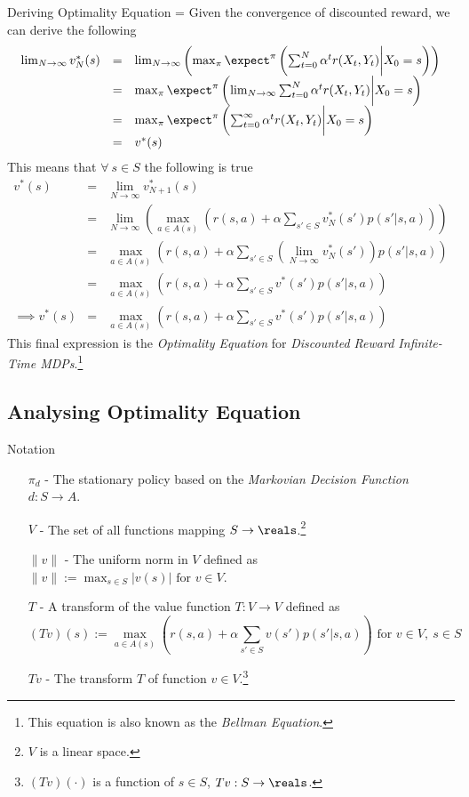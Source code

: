 \documentclass[11pt,a4paper]{article}
\begin{document}
  \begin{proposition}{Deriving Optimality Equation}
    \everymath={\displaystyle}
    Given the convergence of discounted reward, we can derive the following
    \[\begin{array}{rcl}
      \lim_{N\to\infty}v_N^*(s)&=&\lim_{N\to\infty}\left(\max_\pi\expect^\pi\left(\sum_{t=0}^N\alpha^tr(X_t,Y_t)\bigg|X_0=s\right)\right)\\
      &=&\max_\pi\expect^\pi\left(\lim_{N\to\infty}\sum_{t=0}^N\alpha^tr(X_t,Y_t)\bigg|X_0=s\right)\\
      &=&\max_\pi\expect^\pi\left(\sum_{t=0}^\infty\alpha^tr(X_t,Y_t)\bigg|X_0=s\right)\\
      &=&v^*(s )
    \end{array}\]
    This means that $\forall\ s\in S$ the following is true
    \[\begin{array}{rcl}
      v^*(s)&=&\lim_{N\to\infty}v_{N+1}^*(s)\\
      &=&\lim_{N\to\infty}\left(\max_{a\in A(s)}\left(r(s,a)+\alpha\sum_{s'\in S}v_N^*(s')p(s'|s,a)\right)\right)\\
      &=&\max_{a\in A(s)}\left(r(s,a)+\alpha\sum_{s'\in S}\left(\lim_{N\to\infty}v_N^*(s')\right)p(s'|s,a)\right)\\
      &=&\max_{a\in A(s)}\left(r(s,a)+\alpha\sum_{s'\in S}v^*(s')p(s'|s,a)\right)\\
      \implies v^*(s)&=&\max_{a\in A(s)}\left(r(s,a)+\alpha\sum_{s'\in S}v^*(s')p(s'|s,a)\right)
    \end{array}\]
    This final expression is the \textit{Optimality Equation} for \textit{Discounted Reward Infinite-Time MDPs}.\footnote{This equation is also known as the \textit{Bellman Equation}.}
  \end{proposition}

\subsection*{Analysing Optimality Equation}

  \begin{remark}{Notation}
    \begin{itemize}
      \item[$\pi_d$] - The stationary policy based on the \textit{Markovian Decision Function} $d:S\to A$.
      \item[$V$] - The set of all functions mapping $S\to\reals$.\footnote{$V$ is a linear space.}
      \item[$\|v\|$] - The uniform norm in $V$ defined as $\|v\|:=\max_{s\in S}|v(s)|\text{ for }v\in V$.
      \item[$T$] - A transform of the value function $T:V\to V$ defined as
      \[ (Tv)(s):=\max_{a\in A(s)}\left(r(s,a)+\alpha\sum_{s'\in S}v(s')p(s'|s,a)\right)\text{ for }v\in V,\ s\in S \]
      \item[$Tv$] - The transform $T$ of function $v\in V$.\footnote{$(Tv)(\cdot)$ is a function of $s\in S$, $Tv:S\to\reals$.}
    \end{itemize}
  \end{remark}
\end{document}
